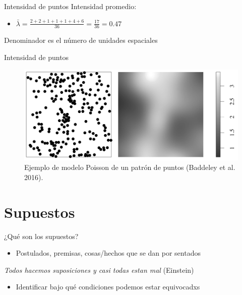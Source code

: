 \documentclass[
  11pt,
  ignorenonframetext,
]{beamer}
\providecommand{\tightlist}{%
  \setlength{\itemsep}{0pt}\setlength{\parskip}{0pt}}
\begin{document}
\begin{frame}{Intensidad de puntos}
\protect\hypertarget{intensidad-de-puntos-2}{}
Intensidad promedio:

\begin{itemize}
\tightlist
\item
  \(\bar{\lambda} = \frac{2+2+1+1+1+4+6}{36} = \frac{17}{36}=0.47\)
\end{itemize}

Denominador es el número de unidades espaciales
\end{frame}

\begin{frame}{Intensidad de puntos}
\protect\hypertarget{intensidad-de-puntos-3}{}
\begin{figure}

{\centering \includegraphics{Figuras/Intensidad} 

}

\caption{Ejemplo de modelo Poisson de un patrón de puntos (Baddeley et al. 2016).}\label{fig:unnamed-chunk-1}
\end{figure}
\end{frame}

\hypertarget{supuestos}{%
\section{Supuestos}\label{supuestos}}

\begin{frame}{¿Qué son los supuestos?}
\protect\hypertarget{quuxe9-son-los-supuestos}{}
\begin{itemize}
\tightlist
\item
  Postulados, premisas, cosas/hechos que se dan por sentados
\end{itemize}

\emph{Todos hacemos suposiciones y casi todas estan mal} (Einstein)

\begin{itemize}
\tightlist
\item
  Identificar bajo qué condiciones podemos estar equivocadxs
\end{itemize}
\end{frame}
\end{document}
